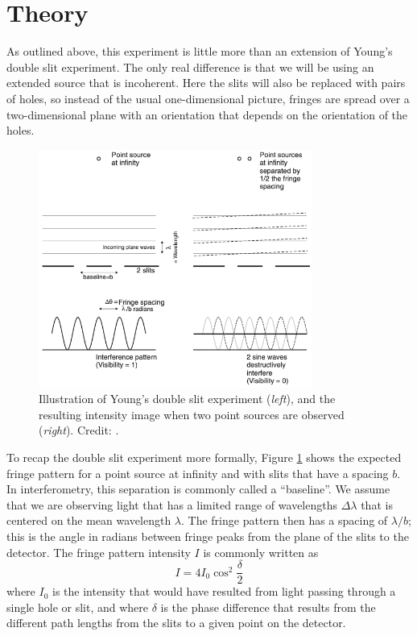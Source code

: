 \documentclass[11pt]{article}
\begin{document}
\clearpage
\section{Theory}\label{sec:theory}

As outlined above, this experiment is little more than an extension of Young's double slit experiment. The only real difference is that we will be using an extended source that is incoherent. Here the slits will also be replaced with pairs of holes, so instead of the usual one-dimensional picture, fringes are spread over a two-dimensional plane with an orientation that depends on the orientation of the holes. 

\begin{figure}[h]
    \centering
    \includegraphics[width=0.8\textwidth]{doc/youngs.png}
    \caption{Illustration of Young's double slit experiment (\emph{left}), and the resulting intensity image when two point sources are observed (\emph{right}). Credit: \citet{2003RPPh...66..789M}.}
    \label{fig:youngs}
\end{figure}

To recap the double slit experiment more formally, Figure \ref{fig:youngs} shows the expected fringe pattern for a point source at infinity and with slits that have a spacing $b$. In interferometry, this separation is commonly called a ``baseline''. We assume that we are observing light that has a limited range of wavelengths $\Delta \lambda$ that is centered on the mean wavelength $\lambda$. The fringe pattern then has a spacing of $\lambda/b$; this is the angle in radians between fringe peaks from the plane of the slits to the detector. The fringe pattern intensity $I$ is commonly written as
\begin{equation}\label{eq:fringepattern}
    I = 4 I_0 \cos^2 \frac{\delta}{2}
\end{equation}
where $I_0$ is the intensity that would have resulted from light passing through a single hole or slit, and where $\delta$ is the phase difference that results from the different path lengths from the slits to a given point on the detector.
\end{document}
